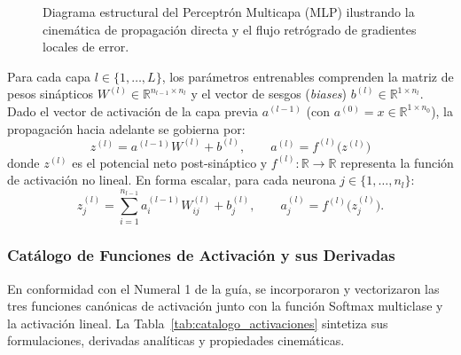 \documentclass[11pt,letterpaper]{article}
\begin{document}
\begin{figure}[htbp]
\caption{Diagrama estructural del Perceptrón Multicapa (MLP) ilustrando la cinemática de propagación directa y el flujo retrógrado de gradientes locales de error.}
\label{fig:esquema_mlp_tikz}
\end{figure}

Para cada capa $l \in \{1, \dots, L\}$, los parámetros entrenables comprenden la matriz de pesos sinápticos $W^{(l)} \in \mathbb{R}^{n_{l-1} \times n_l}$ y el vector de sesgos (\textit{biases}) $b^{(l)} \in \mathbb{R}^{1 \times n_l}$. Dado el vector de activación de la capa previa $a^{(l-1)}$ (con $a^{(0)} = x \in \mathbb{R}^{1 \times n_0}$), la propagación hacia adelante se gobierna por:
\begin{equation}
    z^{(l)} = a^{(l-1)} W^{(l)} + b^{(l)}, \qquad a^{(l)} = f^{(l)}\big(z^{(l)}\big)
    \label{eq:forward_vectorial}
\end{equation}
donde $z^{(l)}$ es el potencial neto post-sináptico y $f^{(l)}: \mathbb{R} \to \mathbb{R}$ representa la función de activación no lineal. En forma escalar, para cada neurona $j \in \{1, \dots, n_l\}$:
\begin{equation}
    z_j^{(l)} = \sum_{i=1}^{n_{l-1}} a_i^{(l-1)} W_{ij}^{(l)} + b_j^{(l)}, \qquad a_j^{(l)} = f^{(l)}\big(z_j^{(l)}\big).
\end{equation}

\subsubsection{Catálogo de Funciones de Activación y sus Derivadas}

En conformidad con el Numeral 1 de la guía, se incorporaron y vectorizaron las tres funciones canónicas de activación junto con la función Softmax multiclase y la activación lineal. La Tabla~\ref{tab:catalogo_activaciones} sintetiza sus formulaciones, derivadas analíticas y propiedades cinemáticas.
\end{document}
